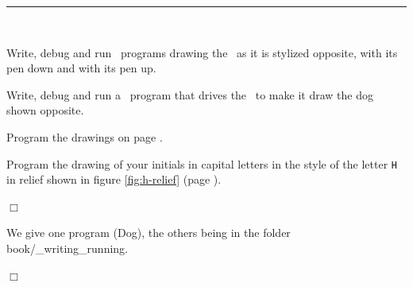 \noindent \rule{137mm}{0.1mm}\par\nopagebreak %
\begin{exercices}{\ \\

\vspace{-\baselineskip}
\noindent \begin{minipage}[t]{88mm}
\tiret Write, debug and run \python\ programs drawing the
\robot\ as it is stylized opposite, with its
pen down and with its pen up.
\end{minipage}
\hfill
\begin{minipage}[t]{44mm}
\vspace{2.0cm}
\hspace{-4.4cm}  %
\end{minipage}

\noindent \begin{minipage}[t]{103mm}
\tiret  Write, debug and run a \python\ program that
drives the \robot\ to make it draw the dog shown
opposite.
\end{minipage}
\hfill
\begin{minipage}[t]{29mm}
\vspace{2.3cm}
\hspace{-2.9cm}  %
\end{minipage}

\noindent \begin{minipage}[t]{103mm}
\tiret  Program the drawings on
pa\-ge \pageref{fig:quadrilateres}.
\end{minipage}

\vspace{1.5mm}

\tiret  Program the drawing of your initials in capital letters
in the style of the letter {\tt H} in relief shown in
figure \ref{fig:h-relief} (page \pageref{fig:h-relief}).

\noindent $\Box$}\end{exercices}

\begin{corrige}{We give one program ({\idt Dog}), the others being in the folder {\idt book/\_writing\_running}.

\noindent $\Box$}\end{corrige}

\vfill

